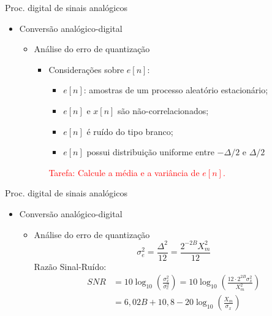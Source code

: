 \begin{slide}{Proc. digital de sinais anal\'ogicos}
\begin{itemize}
   \item Conversão analógico-digital
   \begin{itemize}
      \item Análise do erro de quantização
      \begin{itemize}
         \item Considerações sobre $e[n]$:
         \begin{itemize}
             \item $e[n]$: amostras de um processo aleatório estacionário;
             \item $e[n]$ e $x[n]$ são não-correlacionados;
             \item $e[n]$ é ruído do tipo branco;
             \item $e[n]$ possui distribuição uniforme entre $-\Delta /2$ e $\Delta /2$
         \end{itemize}
         \textcolor{red}{Tarefa: Calcule a média e a variância de $e[n]$.}
      \end{itemize}

   \end{itemize}
\end{itemize}
\end{slide}
\begin{slide}{Proc. digital de sinais anal\'ogicos}
\begin{itemize}
   \item Conversão analógico-digital
   \begin{itemize}
      \item Análise do erro de quantização
       \begin{equation}
        \sigma^2_e = \frac{\Delta^2}{12} = \frac{2^{-2B}X_m^2}{12}
      \end{equation}
      Razão Sinal-Ruído:
     \begin{align*}
         SNR &= 10\log_{10}\left ( \frac{\sigma_x^2}{\sigma_e^2} \right )= 10\log_{10}\left ( \frac{12\cdot 2^{2B}\sigma_x^2}{X_m^2} \right )\\
                 &= 6,02 B + 10,8-20\log_{10}\left(\frac{X_m}{\sigma_x} \right )
     \end{align*}


   \end{itemize}
\end{itemize}
\end{slide}


